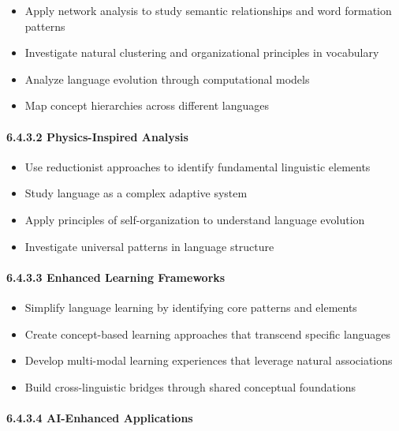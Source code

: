 \documentclass[11pt,letterpaper]{article}
\begin{document}
\begin{itemize}
\tightlist
\item
  Apply network analysis to study semantic relationships and word
  formation patterns
\item
  Investigate natural clustering and organizational principles in
  vocabulary
\item
  Analyze language evolution through computational models
\item
  Map concept hierarchies across different languages
\end{itemize}

\paragraph{6.4.3.2 Physics-Inspired
Analysis}\label{physics-inspired-analysis}

\begin{itemize}
\tightlist
\item
  Use reductionist approaches to identify fundamental linguistic
  elements
\item
  Study language as a complex adaptive system
\item
  Apply principles of self-organization to understand language evolution
\item
  Investigate universal patterns in language structure
\end{itemize}

\paragraph{6.4.3.3 Enhanced Learning
Frameworks}\label{enhanced-learning-frameworks}

\begin{itemize}
\tightlist
\item
  Simplify language learning by identifying core patterns and elements
\item
  Create concept-based learning approaches that transcend specific
  languages
\item
  Develop multi-modal learning experiences that leverage natural
  associations
\item
  Build cross-linguistic bridges through shared conceptual foundations
\end{itemize}

\paragraph{6.4.3.4 AI-Enhanced
Applications}\label{ai-enhanced-applications}
\end{document}
